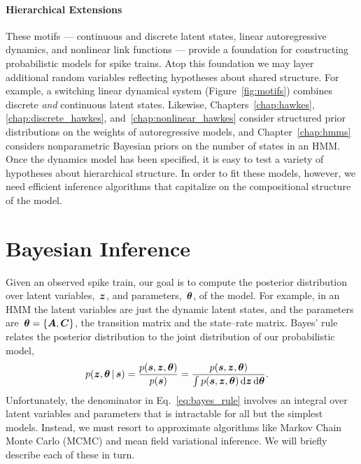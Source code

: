 
\paragraph{Hierarchical Extensions}
These motifs --- continuous and discrete latent states, linear autoregressive 
dynamics, and nonlinear link functions --- provide a foundation for 
constructing probabilistic models for spike trains. Atop this foundation 
we may layer additional random variables reflecting hypotheses about shared 
structure. For example, a switching linear dynamical system (Figure~\ref{fig:motifs})
combines discrete \emph{and} continuous latent states. 
Likewise, Chapters~\ref{chap:hawkes}, \ref{chap:discrete_hawkes},
and~\ref{chap:nonlinear_hawkes} consider structured prior distributions on 
the weights of autoregressive models, and Chapter~\ref{chap:hmms} considers 
nonparametric Bayesian priors on the number of states in an HMM. Once the 
dynamics model has been specified, it is easy to test a variety of hypotheses
about hierarchical structure. In order to fit these models, however, we need 
efficient inference algorithms that capitalize on the compositional structure 
of the model.



\section{Bayesian Inference}
\label{sec:inference_algorithms}
Given an observed spike train, our goal is to compute the posterior
distribution over latent variables,~$\boldsymbol{z}$, and parameters,~$\boldsymbol{\theta}$,
of the model.  For example, in an HMM the latent variables are just
the dynamic latent states, and the parameters
are~${\boldsymbol{\theta} = \{\boldsymbol{A}, \boldsymbol{C}\}}$, the transition matrix and the
state--rate matrix. Bayes' rule relates the posterior distribution to
the joint distribution of our probabilistic model,
\begin{align}
  \label{eq:bayes_rule}
  p(\boldsymbol{z}, \boldsymbol{\theta} \,|\, \boldsymbol{s}) 
  &= \frac{p(\boldsymbol{s}, \boldsymbol{z}, \boldsymbol{\theta})}{p(\boldsymbol{s})} 
   = \frac{p(\boldsymbol{s}, \boldsymbol{z}, \boldsymbol{\theta})}{\int p(\boldsymbol{s}, \boldsymbol{z}, \boldsymbol{\theta}) \, \mathrm{d}\boldsymbol{z} \, \mathrm{d}\boldsymbol{\theta}} .
\end{align}
Unfortunately, the denominator in Eq.~\ref{eq:bayes_rule} involves an 
integral over latent variables and parameters that is intractable for 
all but the simplest models. Instead, we must resort to approximate 
algorithms like Markov Chain Monte Carlo (MCMC) and mean field variational 
inference. We will briefly describe each of these in turn.

